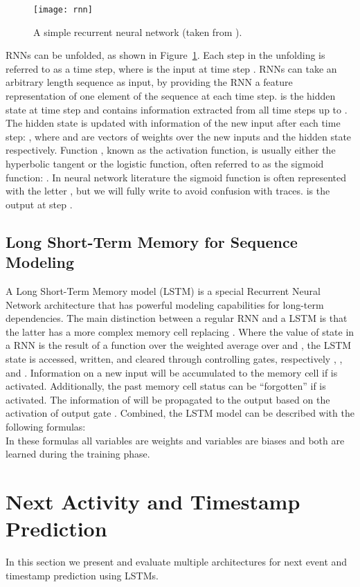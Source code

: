 \documentclass[runningheads,a4paper]{llncs}
\begin{document}
\begin{figure}[t]\centering
	\texttt{[image: rnn]}
	\caption{A simple recurrent neural network (taken from \cite{LeCun2015}).}
	\label{fig:RNNexample}
\end{figure}


RNNs can be unfolded, as shown in Figure~\ref{fig:RNNexample}. Each step in the unfolding is referred to as a time step, where  is the input at time step . RNNs can take an arbitrary length sequence as input, by providing the RNN a feature representation of one element of the sequence at each time step.  is the hidden state at time step  and contains information extracted from all time steps up to . The hidden state  is updated with information of the new input  after each time step: , where  and  are vectors of weights over the new inputs and the hidden state respectively. Function , known as the activation function, is usually either the hyperbolic tangent or the logistic function, often referred to as the sigmoid function: . In neural network literature the sigmoid function is often represented with the letter , but we will fully write  to avoid confusion with traces.  is the output at step .

\subsection{Long Short-Term Memory for Sequence Modeling}
A Long Short-Term Memory model (LSTM) \cite{Hochreiter1997} is a special Recurrent Neural Network architecture that has powerful modeling capabilities for long-term dependencies. The main distinction between a regular RNN and a LSTM is that the latter has a more complex memory cell  replacing . Where the value of state  in a RNN is the result of a function over the weighted average over  and , the LSTM state  is accessed, written, and cleared through controlling gates, respectively , , and . Information on a new input will be accumulated to the memory cell if  is activated. Additionally, the past memory cell status  can be ``forgotten'' if  is activated. The information of  will be propagated to the output  based on the activation of output gate . Combined, the LSTM model can be described with the following formulas:\\


In these formulas all  variables are weights and  variables are biases and both are learned during the training phase. 
\section{Next Activity and Timestamp Prediction}
\label{sec:next_activity}
In this section we present and evaluate multiple architectures for next event and timestamp prediction using LSTMs.
\end{document}
